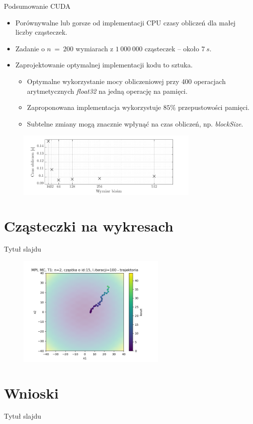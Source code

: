 \documentclass[handout]{beamer}
\begin{document}
\begin{frame}{Podsumowanie CUDA}
\begin{itemize}
\item Porównywalne lub gorsze od implementacji CPU czasy obliczeń dla małej liczby cząsteczek.
\item Zadanie o $n \ = \ 200$ wymiarach z $1 \ 000 \ 000$ cząsteczek -- około $7 \ s$.
\item Zaprojektowanie optymalnej implementacji kodu to sztuka.
\begin{itemize}
\item Optymalne wykorzystanie mocy obliczeniowej przy 400 operacjach arytmetycznych \textit{float32} na jedną operację na pamięci.
\item Zaproponowana implementacja wykorzystuje $85\% $ przepustowości pamięci.
\item Subtelne zmiany mogą znacznie wpłynąć na czas obliczeń, np. \textit{blockSize}.
\end{itemize}
\end{itemize}
\begin{figure}[t]
\includegraphics[width=0.8\textwidth]{grafiki/blocksizeplot.pdf}
\end{figure}
\end{frame}



\section{Cząsteczki na wykresach}
\begin{frame}{Tytuł slajdu}
\begin{figure}[t]
\includegraphics[width=0.65\textwidth]{grafiki/MPI_ MC_T1_trajectory_id15.png}
\end{figure}
\end{frame}




\section{Wnioski}
\begin{frame}{Tytuł slajdu}
\end{frame}
\end{document}
